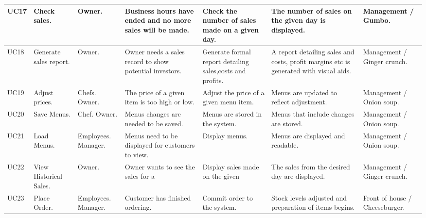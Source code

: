 \begin{tabularx}{\linewidth}{|X|X|X|X|X|X|X|}
\hline
UC17 & Check sales. & Owner. & Business hours have ended and no more sales will be made. & Check the number of sales made on a given day. & The number of sales on the given day is displayed. & Management / Gumbo. \\
\hline
UC18 & Generate sales report. & Owner. & Owner needs a sales record to show potential investors. & Generate formal report detailing sales,costs and profits. & A report detailing sales and costs, profit margins etc is generated with visual aids. & Management / Ginger crunch. \\
\hline
UC19 & Adjust prices. & Chefs. Owner. & The price of a given item is too high or low. & Adjust the price of a given menu item. & Menus are updated to reflect adjustment. & Management / Onion soup. \\
\hline
UC20 & Save Menus. & Chef. Owner. & Menus changes are needed to be saved. & Menus are stored in the system. & Menus that include changes are stored. & Management / Onion soup. \\
\hline
UC21 & Load Menus. & Employees. Manager. & Menus need to be displayed for customers to view. & Display menus. & Menus are displayed and readable. & Management / Onion soup. \\
\hline
UC22 & View Historical Sales. & Owner. & Owner wants to see the sales for a & Display sales made on the given & The sales from the desired day are displayed. & Management / Ginger crunch. \\
\hline
UC23 & Place Order. & Employees. Manager. & Customer has finished ordering. & Commit order to the system. & Stock levels adjusted and preparation of items begins. & Front of house / Cheeseburger. \\
\hline
\end{tabularx}
